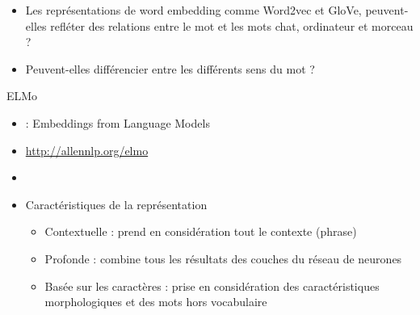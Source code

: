 \documentclass{KodeBook}
\begin{document}
\begin{itemize}
	\item Les représentations de word embedding comme Word2vec et GloVe, peuvent-elles refléter des relations entre le mot  et les mots chat, ordinateur et morceau ?
	\item Peuvent-elles différencier entre les différents sens du mot  ?
\end{itemize}

ELMo

\begin{minipage}{.65\textwidth}
	\begin{itemize}
		\item {} : Embeddings from Language Models
		\item \url{http://allennlp.org/elmo}
		\item \cite{2018-peters-al}
		\item Caractéristiques de la représentation
		\begin{itemize}
			\item Contextuelle :  prend en considération tout le contexte (phrase)
			\item Profonde : combine tous les résultats des couches du réseau de neurones
			\item Basée sur les caractères : prise en considération des caractéristiques morphologiques et des mots hors vocabulaire
		\end{itemize}
	\end{itemize}
\end{minipage}
\begin{minipage}{.33\textwidth}
	\vspace{2cm}
\end{minipage}

\end{document}
